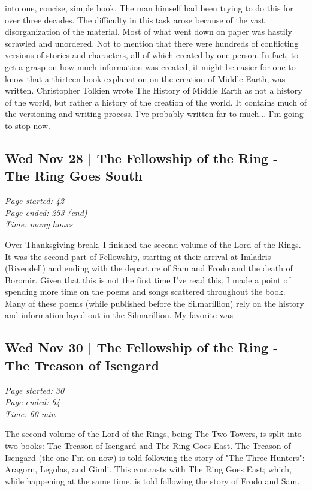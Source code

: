 \documentclass{article}
\begin{document}
into one, concise, simple book. The man himself had been trying to do this for
over three decades. The difficulty in this task arose because of the vast
disorganization of the material. Most of what went down on paper was hastily
scrawled and unordered. Not to mention that there were hundreds of conflicting
versions of stories and characters, all of which created by one person. In fact,
to get a grasp on how much information was created, it might be easier for one
to know that a thirteen-book explanation on the creation of Middle Earth, was
written. Christopher Tolkien wrote The History of Middle Earth as not a history
of the world, but rather a history of the creation of the world. It contains
much of the versioning and writing process. I've probably written far to
much... I'm going to stop now.

\subsection{Wed Nov 28 | The Fellowship of the Ring - The Ring Goes South}
\textit{Page started: 42 \\
        Page ended: 253 (end) \\
        Time: many hours \\
}

Over Thanksgiving break, I finished the second volume of the Lord of the Rings.
It was the second part of Fellowship, starting at their arrival at Imladris
(Rivendell) and ending with the departure of Sam and Frodo and the death of
Boromir. Given that this is not the first time I've read this, I made a point
of spending more time on the poems and songs scattered throughout the book.
Many of these poems (while published before the Silmarillion) rely on the
history and information layed out in the Silmarillion. My favorite was 


\subsection{Wed Nov 30 | The Fellowship of the Ring - The Treason of Isengard}
\textit{Page started: 30 \\
        Page ended: 64 \\
        Time: 60 min \\
}

The second volume of the Lord of the Rings, being The Two Towers, is split into
two books: The Treason of Isengard and The Ring Goes East. The Treason of
Isengard (the one I'm on now) is told following the story of "The Three
Hunters": Aragorn, Legolas, and Gimli. This contrasts with The Ring Goes East;
which, while happening at the same time, is told following the story of Frodo
and Sam.
\end{document}
